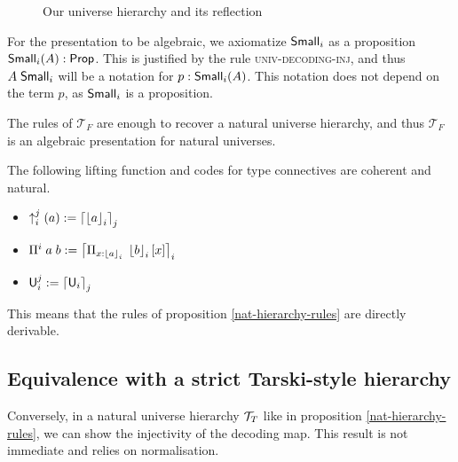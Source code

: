 \documentclass{article}
\DeclarePairedDelimiter\brk{[}{]}
\begin{document}
\begin{figure}[H]
\caption{Our universe hierarchy and its reflection }
\end{figure}


For the presentation to be algebraic, we axiomatize $\textsf{Small}_i$ as a proposition $\textsf{Small}_i(A): \mathsf{Prop}$. This is justified by the rule \textsc{univ-decoding-inj}, and thus $A \; \textsf{Small}_i$ will be a notation for $p : \textsf{Small}_i(A)$. This notation  does not depend on the term $p$, as $\textsf{Small}_i$ is a proposition. 

The rules of $\mathcal{T}_F$ are enough to recover a natural universe hierarchy, and thus $\mathcal{T}_F$ is an algebraic presentation for natural universes.

\begin{proposition}\label{derivability}
    The following lifting function and codes for type connectives are coherent and natural.

    \begin{itemize}
        \item $\uparrow_i^j (a) := \left\lceil \left\lfloor a \right\rfloor_i \right\rceil_j$
        \item $\Pi^i \; a \; b := \code{ \Pi_{x:\decode{a}_i}\; \decode{b}_i\brk{x}}_i$
        \item $\textsf{U}_i^j := \left\lceil \textsf{U}_i \right\rceil_j$
    \end{itemize}

    This means that the rules of proposition \ref{nat-hierarchy-rules} are directly derivable.
    
    \end{proposition}


\subsection{Equivalence with a strict Tarski-style hierarchy}

Conversely, in a natural universe hierarchy $\mathcal{T}_T$ like in proposition \ref{nat-hierarchy-rules},
we can show the injectivity of the decoding map. This result is not immediate and relies
on normalisation.
\end{document}
